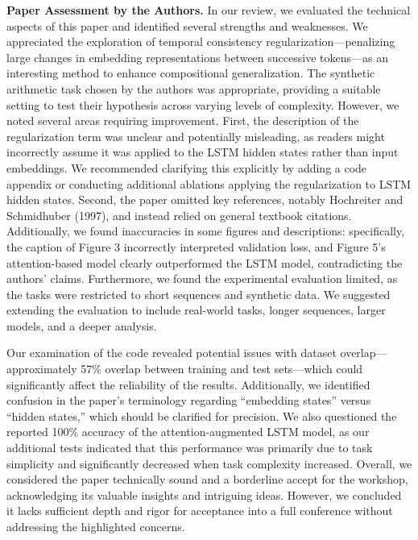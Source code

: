 \documentclass[11pt, a4paper]{include/gdm_format}
\begin{document}
\begin{tcolorbox}[colback=blue!5!white, colframe=blue!75!black, title=Initial Idea for the Workshop-Accepted Paper]
{\scriptsize  }
\end{tcolorbox}

\textbf{Paper Assessment by the Authors.} In our review, we evaluated the technical aspects of this paper and identified several strengths and weaknesses. We appreciated the exploration of temporal consistency regularization—penalizing large changes in embedding representations between successive tokens—as an interesting method to enhance compositional generalization. The synthetic arithmetic task chosen by the authors was appropriate, providing a suitable setting to test their hypothesis across varying levels of complexity.
%
However, we noted several areas requiring improvement. First, the description of the regularization term was unclear and potentially misleading, as readers might incorrectly assume it was applied to the LSTM hidden states rather than input embeddings. We recommended clarifying this explicitly by adding a code appendix or conducting additional ablations applying the regularization to LSTM hidden states. Second, the paper omitted key references, notably Hochreiter and Schmidhuber (1997), and instead relied on general textbook citations. Additionally, we found inaccuracies in some figures and descriptions: specifically, the caption of Figure 3 incorrectly interpreted validation loss, and Figure 5's attention-based model clearly outperformed the LSTM model, contradicting the authors' claims. Furthermore, we found the experimental evaluation limited, as the tasks were restricted to short sequences and synthetic data. We suggested extending the evaluation to include real-world tasks, longer sequences, larger models, and a deeper analysis.

Our examination of the code revealed potential issues with dataset overlap—approximately 57\% overlap between training and test sets—which could significantly affect the reliability of the results. Additionally, we identified confusion in the paper's terminology regarding ``embedding states'' versus ``hidden states,'' which should be clarified for precision. We also questioned the reported 100\% accuracy of the attention-augmented LSTM model, as our additional tests indicated that this performance was primarily due to task simplicity and significantly decreased when task complexity increased. Overall, we considered the paper technically sound and a borderline accept for the workshop, acknowledging its valuable insights and intriguing ideas. However, we concluded it lacks sufficient depth and rigor for acceptance into a full conference without addressing the highlighted concerns.
\end{document}

